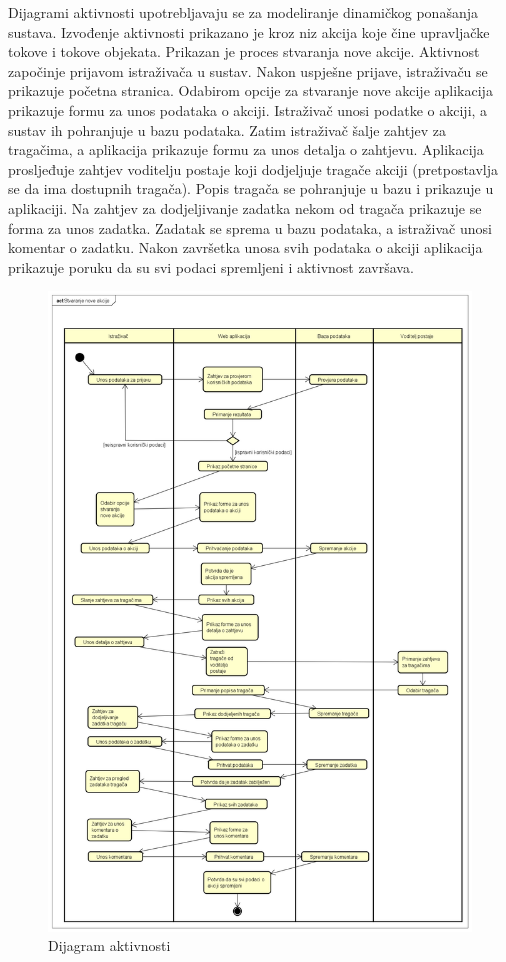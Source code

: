 			Dijagrami aktivnosti upotrebljavaju se za modeliranje dinamičkog ponašanja sustava. Izvođenje aktivnosti prikazano je kroz niz akcija koje čine upravljačke tokove i tokove objekata. Prikazan je proces stvaranja nove akcije. Aktivnost započinje prijavom istraživača u sustav. Nakon uspješne prijave, istraživaču se prikazuje početna stranica. Odabirom opcije za stvaranje nove akcije aplikacija prikazuje formu za unos podataka o akciji. Istraživač unosi podatke o akciji, a sustav ih pohranjuje u bazu podataka. Zatim istraživač šalje zahtjev za tragačima, a aplikacija prikazuje formu za unos detalja o zahtjevu. Aplikacija prosljeđuje zahtjev voditelju postaje koji dodjeljuje tragače akciji (pretpostavlja se da ima dostupnih tragača). Popis tragača se pohranjuje u bazu i prikazuje u aplikaciji. Na zahtjev za dodjeljivanje zadatka nekom od tragača prikazuje se forma za unos zadatka. Zadatak se sprema u bazu podataka, a istraživač unosi komentar o zadatku. Nakon završetka unosa svih podataka o akciji aplikacija prikazuje poruku da su svi podaci spremljeni i aktivnost završava.
			
			\begin{figure}[H]
				\includegraphics[scale=0.4]{dijagrami/DijAktivnosti.png} 
				\centering
				\caption{Dijagram aktivnosti}
				\label{fig:promjene}
			\end{figure}
			

